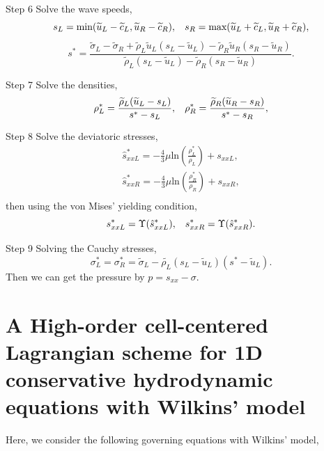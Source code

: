 \documentclass{article}
\numberwithin{equation}{section}
\numberwithin{table}{section}
\begin{document}
Step 6  Solve the wave speeds,
\begin{equation*}
  s_L = \text{min} (\widetilde{u}_L-\widetilde{c}_L, \widetilde{u}_R-\widetilde{c}_R), \hspace{0.3cm} s_R = \text{max}(\widetilde{u}_L+\widetilde{c}_L, \widetilde{u}_R+\widetilde{c}_R),
	\end{equation*}
	\begin{equation*}
	  s^* = \frac{\widetilde{\sigma}_L-\widetilde{\sigma}_R+\widetilde{\rho}_L \widetilde{u}_L(s_L-\widetilde{u}_L)-\widetilde{\rho}_R \widetilde{u}_R(s_R-\widetilde{u}_R)}{\widetilde{\rho}_L(s_L-\widetilde{u}_L)-\widetilde{\rho}_R(s_R-\widetilde{u}_R)}.
\end{equation*}

Step 7  Solve the densities,
\begin{equation*}
  \rho_L^* = \frac{\widetilde{\rho}_L(\widetilde{u}_L-s_L)}{s^*-s_L}, \hspace{0.3cm}  \rho_R^* = \frac{\widetilde{\rho}_R(\widetilde{u}_R-s_R)}{s^*-s_R},
\end{equation*}

Step 8 Solve the deviatoric stresses,
 \begin{align*}
  \hat{s}_{xxL}^* =  -\frac{4}{3}\mu \text{ln}\left( \frac{\rho_L^*}{\rho_L}  \right)+s_{xxL},\\
  \hat{s}_{xxR}^* =  -\frac{4}{3}\mu \text{ln}\left( \frac{\rho_R^*}{\rho_R}  \right)+s_{xxR},\\
\end{align*}
then using  the von Mises' yielding condition,
\begin{equation*}
  s_{xxL}^* = \Upsilon(\hat{s}_{xxL}^*) , \hspace{0.3cm}  s_{xxR}^* = \Upsilon(\hat{s}_{xxR}^*).
\end{equation*}

Step 9  Solving the Cauchy stresses,
\begin{equation*}
  \sigma_L^*=\sigma_R^*=\widetilde{\sigma}_L -\widetilde{\rho_L} (s_L-\widetilde{u}_L)(s^*-\widetilde{u}_L).
\end{equation*}
 Then we can get the pressure by $p =s_{xx}-\sigma$.

 \section{ A High-order cell-centered Lagrangian scheme for 1D  conservative hydrodynamic equations with Wilkins' model}
Here, we consider the following governing equations with Wilkins' model,
\end{document}
